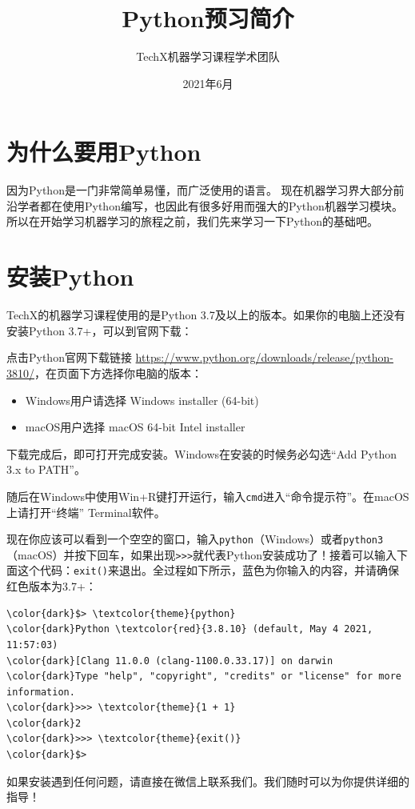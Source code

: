 \documentclass{article}
\title{Python预习简介}
\author{TechX机器学习课程学术团队}
\date{2021年6月}
\begin{document}
\maketitle

\section{为什么要用Python}
因为Python是一门非常简单易懂，而广泛使用的语言。
现在机器学习界大部分前沿学者都在使用Python编写，也因此有很多好用而强大的Python机器学习模块。
所以在开始学习机器学习的旅程之前，我们先来学习一下Python的基础吧。

\section{安装Python}
TechX的机器学习课程使用的是Python 3.7及以上的版本。如果你的电脑上还没有安装Python 3.7+，可以到官网下载：

点击Python官网下载链接 \url{https://www.python.org/downloads/release/python-3810/}，在页面下方选择你电脑的版本：
\begin{itemize}
\item
Windows用户请选择 Windows installer (64-bit)
\item
macOS用户选择 macOS 64-bit Intel installer
\end{itemize}
下载完成后，即可打开完成安装。Windows在安装的时候务必勾选“Add Python 3.x to PATH”。

随后在Windows中使用Win+R键打开运行，输入\texttt{cmd}进入“命令提示符”。在macOS上请打开“终端” Terminal软件。

现在你应该可以看到一个空空的窗口，输入\texttt{python}（Windows）或者\texttt{python3}（macOS）并按下回车，如果出现\texttt{>>>}就代表Python安装成功了！接着可以输入下面这个代码：\texttt{exit()}来退出。全过程如下所示，蓝色为你输入的内容，并请确保红色版本为3.7+：

\begin{Verbatim}[commandchars=\\\{\},xleftmargin=1.5cm]
\color{dark}$> \textcolor{theme}{python}
\color{dark}Python \textcolor{red}{3.8.10} (default, May 4 2021, 11:57:03)
\color{dark}[Clang 11.0.0 (clang-1100.0.33.17)] on darwin
\color{dark}Type "help", "copyright", "credits" or "license" for more information.
\color{dark}>>> \textcolor{theme}{1 + 1}
\color{dark}2
\color{dark}>>> \textcolor{theme}{exit()}
\color{dark}$>
\end{Verbatim}

如果安装遇到任何问题，请直接在微信上联系我们。我们随时可以为你提供详细的指导！
\end{document}
